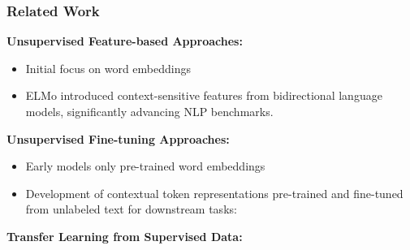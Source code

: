 \documentclass[11pt,xcolor={dvipsnames},hyperref={pdftex,pdfpagemode=UseNone,hidelinks,pdfdisplaydoctitle=true},usepdftitle=false]{beamer}
\begin{document}
\begin{frame}
\frametitle{Related Work}

\textbf{Unsupervised Feature-based Approaches:}
\begin{itemize}
    \item Initial focus on word embeddings
    \item ELMo introduced context-sensitive features from bidirectional language models, significantly advancing NLP benchmarks.
\end{itemize}

\textbf{Unsupervised Fine-tuning Approaches:}
\begin{itemize}
    \item Early models only pre-trained word embeddings 
    \item Development of contextual token representations pre-trained and fine-tuned from unlabeled text for downstream tasks:
\end{itemize}

\textbf{Transfer Learning from Supervised Data:}

\end{frame}
\end{document}
